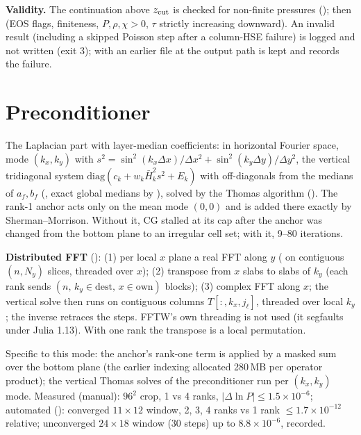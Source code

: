 \textbf{Validity.} The continuation above $z_{\rm cut}$ is checked for non-finite pressures ();
then  (EOS flags, finiteness, $P,\rho,\chi>0$, $\tau$ strictly increasing downward). An invalid result
(including a skipped Poisson step after a column-HSE failure) is logged and not written (exit 3); with 
an earlier file at the output path is kept and  records the failure.

\section{Preconditioner}
The Laplacian part with layer-median coefficients: in horizontal Fourier space, mode $(k_x,k_y)$ with
$s^2=\sin^2(k_x\Delta x)/\Delta x^2+\sin^2(k_y\Delta y)/\Delta y^2$, the vertical tridiagonal system
$\mathrm{diag}(c_k+w_k\bar H_k^2s^2+E_k)$ with off-diagonals from the medians of $a_f,b_f$ (, exact global
medians by ), solved by the Thomas algorithm (). The rank-1 anchor acts only on the mean mode
$(0,0)$ and is added there exactly by Sherman--Morrison. Without it, CG stalled at its cap after the anchor was changed
from the bottom plane to an irregular cell set; with it, 9--80 iterations.

\textbf{Distributed FFT} (): (1) per local $x$ plane a real FFT along $y$ ( on contiguous
$(n,N_y)$ slices, threaded over $x$); (2)  transpose from $x$ slabs to slabs of $k_y$ (each rank
sends $(n,\,k_y\in\text{dest},\,x\in\text{own})$ blocks); (3) complex FFT along $x$; the vertical solve then runs on contiguous
columns $T[:,k_x,j_\ell]$, threaded over local $k_y$; the inverse retraces the steps. FFTW's own threading is not used (it
segfaults under Julia 1.13). With one rank the transpose is a local permutation.



Specific to this mode: the anchor's rank-one term is applied by a masked sum over the bottom plane (the earlier
 indexing allocated 280\,MB per operator product); the vertical Thomas solves of the preconditioner run per
$(k_x,k_y)$ mode. Measured (manual): $96^2$ crop, 1 vs 4 ranks, $|\Delta\ln P|\le1.5\times10^{-6}$; automated
(): converged $11\times12$ window, 2, 3, 4 ranks vs 1 rank $\le1.7\times10^{-12}$ relative; unconverged
$24\times18$ window (30 steps) up to $8.8\times10^{-6}$, recorded.

